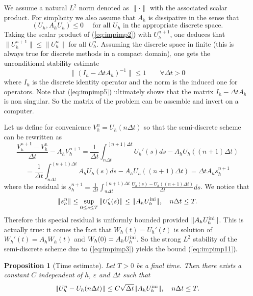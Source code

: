 \documentclass[a4paper,french,english,10pt]{article}
\newcommand\eps{\varepsilon}
\newtheorem{proposition}[theorem]{Proposition}
\begin{document}
 We  assume a natural $L^2$ norm denoted as $\|  \cdot \|$ with the associated scalar product.
 For simplicity we also assume that $A_h$ is dissipative in the sense that 
 $$
 (U_h, A_h U_h)\leq 0 \quad \mbox{ for all }
 U_h \mbox { in the appropriate discrete space.}
 $$ 
 Taking the scalar product of (\ref{eq:impimp2}) with $U_h^{n+1}$,  one deduces that 
 $\|   U_{h}^{n+1}\| \leq \| U_{h}^n\|$ for all $U_h^n$.
Assuming the discrete space in finite (this is always true for discrete methods in a compact domain),
one gets the unconditional stability estimate
\begin{equation} \label{eq:impimp5}
\|  (I_h-\Delta t A_h)^{-1}\| \leq 1 \qquad \forall \Delta t>0
\end{equation}
where $I_h$ is the discrete  identity operator and the norm is the induced one for operators.
Note that (\ref{eq:impimp5})  ultimately shows that the matrix $I_h-\Delta t A_h$ is non singular.
So the matrix of the problem can be assemble and invert on a computer.

Let us define for convenience  $V_{h}^n=U_{h}(n\Delta t)$ so that the semi-discrete scheme can  be rewritten as
$$
\frac{  V_{h}^{n+1} -V_{h}^n}{\Delta t}-
A_h V_{h}^{n+1}=
\frac1{\Delta t}\int_{n\Delta t}^{(n+1)\Delta t}  U_{h}'(s) ds - A_h U_{h}((n+1)\Delta t)
$$
$$
= \frac1{\Delta t}\int_{n\Delta t}^{(n+1) \Delta t}A_h U_{h}(s) ds - A_h U_{h}((n+1)\Delta t)
=\Delta t A_h  s_{h}^{n+1}
$$
where the residual %
 is 
$
 s_{h}^{n+1}=
\frac1{\Delta t}\int_{n\Delta t}^{(n+1)\Delta t}  \frac{ U_{h}(s)  -  U_{h}((n+1)\Delta t)}{\Delta t} ds
$. 
We notice that
\begin{equation} \label{eq:impimp11}
\| s_{h}^n \|\leq 
\sup_{0\leq s \leq T}\| U_{h}'(s) \| \leq 
\| A_h U_h^{\rm ini}\|, \quad n\Delta t \leq T.
\end{equation}
Therefore this special residual is uniformly bounded provided $\| A_h U_h^{\rm ini}\|$.
This is actually true: it comes the fact that $W_{h}(t)=U_{h}'(t)$ is solution of 
$
W_{h}'(t)=A_h W_h(t)$ and  $ W_{h}(0)=A_h U_h^{\rm ini}$. 
So the strong $L^2$ stability of the semi-discrete scheme due to (\ref{eq:impimp3}) yields the  bound
(\ref{eq:impimp11}).




\begin{proposition} [Time estimate]
 Let $T>0$ be a final time.
Then there exists a constant $C$ independent of $h$, $\eps$  and $\Delta t$ such that 
\begin{equation} \label{eq:impimp6}
\| U_{h}^n -U_{h}(n\Delta t)  \| \leq C \sqrt {\Delta t} \| A_h U_h^{\rm ini}  \|  , \quad n\Delta t \leq T.
\end{equation}
\end{proposition}
\end{document}
